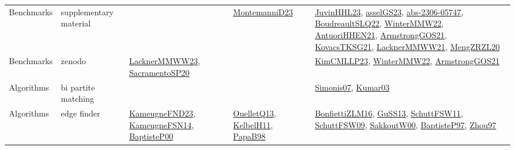 {\begin{longtable}{llp{6cm}p{6cm}p{6cm}}
Benchmarks & supplementary material &  & \href{articles/MontemanniD23.pdf}{MontemanniD23}\cite{MontemanniD23} & \href{papers/JuvinHHL23.pdf}{JuvinHHL23}\cite{JuvinHHL23}, \href{papers/asselGS23.pdf}{asselGS23}\cite{asselGS23}, \href{articles/abs-2306-05747.pdf}{abs-2306-05747}\cite{abs-2306-05747}, \href{papers/BoudreaultSLQ22.pdf}{BoudreaultSLQ22}\cite{BoudreaultSLQ22}, \href{papers/WinterMMW22.pdf}{WinterMMW22}\cite{WinterMMW22}, \href{papers/AntuoriHHEN21.pdf}{AntuoriHHEN21}\cite{AntuoriHHEN21}, \href{papers/ArmstrongGOS21.pdf}{ArmstrongGOS21}\cite{ArmstrongGOS21}, \href{papers/KovacsTKSG21.pdf}{KovacsTKSG21}\cite{KovacsTKSG21}, \href{papers/LacknerMMWW21.pdf}{LacknerMMWW21}\cite{LacknerMMWW21}, \href{articles/MengZRZL20.pdf}{MengZRZL20}\cite{MengZRZL20}\\
Benchmarks & zenodo & \href{articles/LacknerMMWW23.pdf}{LacknerMMWW23}\cite{LacknerMMWW23}, \href{articles/SacramentoSP20.pdf}{SacramentoSP20}\cite{SacramentoSP20} &  & \href{papers/KimCMLLP23.pdf}{KimCMLLP23}\cite{KimCMLLP23}, \href{papers/WinterMMW22.pdf}{WinterMMW22}\cite{WinterMMW22}, \href{papers/ArmstrongGOS21.pdf}{ArmstrongGOS21}\cite{ArmstrongGOS21}\\
Algorithms & bi partite matching &  &  & \href{articles/Simonis07.pdf}{Simonis07}\cite{Simonis07}, \href{papers/Kumar03.pdf}{Kumar03}\cite{Kumar03}\\
Algorithms & edge finder & \href{papers/KameugneFND23.pdf}{KameugneFND23}\cite{KameugneFND23}, \href{articles/KameugneFSN14.pdf}{KameugneFSN14}\cite{KameugneFSN14}, \href{articles/BaptisteP00.pdf}{BaptisteP00}\cite{BaptisteP00} & \href{papers/OuelletQ13.pdf}{OuelletQ13}\cite{OuelletQ13}, \href{articles/KelbelH11.pdf}{KelbelH11}\cite{KelbelH11}, \href{articles/PapaB98.pdf}{PapaB98}\cite{PapaB98} & \href{papers/BonfiettiZLM16.pdf}{BonfiettiZLM16}\cite{BonfiettiZLM16}, \href{papers/GuSS13.pdf}{GuSS13}\cite{GuSS13}, \href{articles/SchuttFSW11.pdf}{SchuttFSW11}\cite{SchuttFSW11}, \href{papers/SchuttFSW09.pdf}{SchuttFSW09}\cite{SchuttFSW09}, \href{articles/SakkoutW00.pdf}{SakkoutW00}\cite{SakkoutW00}, \href{papers/BaptisteP97.pdf}{BaptisteP97}\cite{BaptisteP97}, \href{articles/Zhou97.pdf}{Zhou97}\cite{Zhou97}\\

\end{longtable}}
